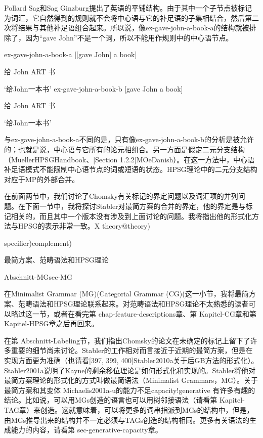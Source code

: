 Pollard  Sag和Sag  Ginzburg提出了英语的平铺结构。由于其中一个子节点被标记为词汇，它自然得到的规则就不会将中心语与它的补足语的子集相结合，然后第二次将结果与其他补足语组合起来。所以说，像ex-gave-john-a-book-a的结构就被排除了，因为“gave John”不是一个词，所以不能用作规则中的中心语节点。






ex-gave-john-a-book-a 
[[gave John] a book]

给 John ART 书

`给John一本书'
ex-gave-john-a-book-b 
[gave John a book]

给 John ART 书

`给John一本书'

与ex-gave-john-a-book-a不同的是，只有像ex-gave-john-a-book-b的分析是被允许的；也就是说，中心语与它所有的论元相组合。另一方面是假定二元分支结构（MuellerHPSGHandbook、[Section 1.2.2]MOeDanish）。在这一方法中，中心语补足语模式不能限制中心语节点的词或短语的状态。HPSG理论中的二元分支结构对应于MP的外部合并。






在前面两节中，我们讨论了Chomsky有关标记的界定问题以及词汇项的并列问题。在下面一节中，我将探讨Stabler对最简方案的合并的界定，他的界定是与标记相关的，而且其中一个版本没有涉及到上面讨论的问题。我将指出他的形式化方法与HPSG的表示非常一致。X theory@theory)





specifier)complement)

最简方案、范畴语法和HPSG理论

Abschnitt-MGsec-MG

在Minimalist Grammar (MG)(Categorial Grammar (CG)(这一小节，我将最简方案、范畴语法和HPSG理论联系起来。对范畴语法和HPSG理论不太熟悉的读者可以略过这一节，或者在看完第 chap-feature-descriptions章、第 Kapitel-CG章和第 Kapitel-HPSG章之后再回来。




在第 Abschnitt-Labeling节，我们指出Chomsky的论文在未确定的标记上留下了许多重要的细节尚未讨论。Stabler的工作相对而言接近于近期的最简方案，但是在实现方面更为准确（也请看[397, 399, 400]Stabler2010a关于后GB方法的形式化）。Stabler2001a说明了Kayne的剩余移位理论是如何形式化和实现的。Stabler将他对最简方案理论的形式化的方式叫做最简语法（Minimalist Grammars，MG）。关于最简方案和其变体 Michaelis2001a-u的能力不足capacity!generative 有许多有趣的结论。比如说，可以用MGs创造的语言也可以用树邻接语法（请看第 Kapitel-TAG章）来创造。这就意味着，可以将更多的词串指派到MGs的结构中，但是，由MGs推导出来的结构并不一定必须与TAGs创造的结构相同。更多有关语法的生成能力的内容，请看第 sec-generative-capacity章。











